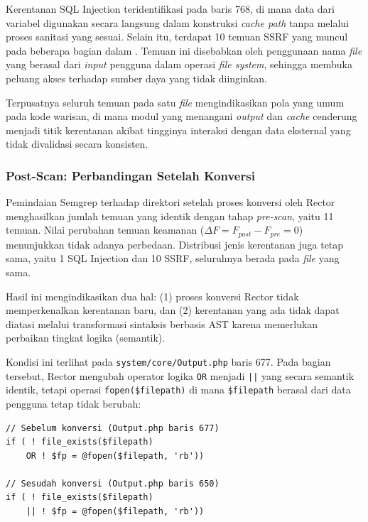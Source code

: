 Kerentanan SQL Injection teridentifikasi pada baris 768, di mana data dari variabel 
\texttt{} digunakan secara langsung dalam konstruksi 
\textit{cache path} tanpa melalui proses sanitasi yang sesuai. Selain itu, terdapat 
10 temuan SSRF yang muncul pada beberapa bagian dalam \texttt{}. 
Temuan ini disebabkan oleh penggunaan nama \textit{file} yang berasal dari 
\textit{input} pengguna dalam operasi \textit{file system}, sehingga membuka peluang 
akses terhadap sumber daya yang tidak diinginkan.

Terpusatnya seluruh temuan pada satu \textit{file} mengindikasikan pola yang umum 
pada kode warisan, di mana modul yang menangani \textit{output} dan \textit{cache} 
cenderung menjadi titik kerentanan akibat tingginya interaksi dengan data eksternal 
yang tidak divalidasi secara konsisten.

\subsubsection{Post-Scan: Perbandingan Setelah Konversi}

Pemindaian Semgrep terhadap direktori \texttt{} setelah proses 
konversi oleh Rector menghasilkan jumlah temuan yang identik dengan tahap 
\textit{pre-scan}, yaitu 11 temuan. Nilai perubahan temuan keamanan 
($\Delta F = F_{post} - F_{pre} = 0$) menunjukkan tidak adanya perbedaan. 
Distribusi jenis kerentanan juga tetap sama, yaitu 1 SQL Injection dan 
10 SSRF, seluruhnya berada pada \textit{file} yang sama.

Hasil ini mengindikasikan dua hal: (1) proses konversi Rector 
tidak memperkenalkan kerentanan baru, dan (2) kerentanan 
yang ada tidak dapat diatasi melalui transformasi sintaksis 
berbasis AST karena memerlukan perbaikan tingkat logika (semantik).

Kondisi ini terlihat pada 
\texttt{system/core/\allowbreak Output.php} baris 677. Pada bagian
tersebut, Rector mengubah operator logika \texttt{OR} menjadi
\texttt{||} yang secara semantik identik, tetapi operasi
\texttt{fopen(\$filepath)} di mana \texttt{\$filepath} berasal
dari data pengguna tetap tidak berubah:

\begin{lstlisting}[style=promptstyle]
// Sebelum konversi (Output.php baris 677)
if ( ! file_exists($filepath)
    OR ! $fp = @fopen($filepath, 'rb'))

// Sesudah konversi (Output.php baris 650)
if ( ! file_exists($filepath)
    || ! $fp = @fopen($filepath, 'rb'))
\end{lstlisting}

